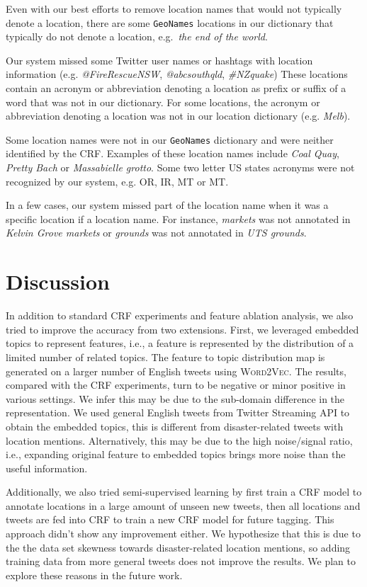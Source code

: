 \documentclass[11pt]{article}
\newcommand{\ie}{i.e.,\xspace}
\newcommand{\geoname}{\texttt{GeoNames}\xspace}
\newcommand{\myex}[1]{\textit{#1}}
\newcommand{\wordvec}{\textsc{Word2Vec}\xspace}
\begin{document}
Even with our best efforts to remove location names that would not typically denote a location, there are some \geoname locations in our dictionary that typically do not denote a location, e.g.~\myex{the end of the world}.

Our system missed some Twitter user names or hashtags with location information (e.g. \myex{@FireRescueNSW}, \myex{@abcsouthqld}, \myex{\#NZquake})
These locations contain an acronym or abbreviation denoting a location as prefix or suffix of a word that was not in our dictionary.
For some locations, the acronym or abbreviation denoting a location was not in our location dictionary (e.g. \myex{Melb}).

Some location names were not in our \geoname dictionary and were neither identified by the CRF.
Examples of these location names include \myex{Coal Quay}, \myex{Pretty Bach} or \myex{Massabielle grotto}.
Some two letter US states acronyms were not recognized by our system, e.g. OR, IR, MT or MT.

In a few cases, our system missed part of the location name when it was a specific location if a location name.
For instance, \myex{markets} was not annotated in \myex{Kelvin Grove markets} or \myex{grounds} was not annotated in \myex{UTS grounds}.

\section{Discussion}
\label{sec:discussion}

In addition to standard CRF experiments and feature ablation analysis, we also tried to improve the accuracy from two extensions.
First, we leveraged embedded topics to represent features, \ie a feature is represented by the distribution of a limited number of related topics.
The feature to topic distribution map is generated on a larger number of English tweets using \wordvec.
The results, compared with the CRF experiments, turn to be negative or minor positive in various settings.
We infer this may be due to the sub-domain difference in the representation.
We used general English tweets from Twitter Streaming API to obtain the embedded topics, this is different from disaster-related tweets with location mentions.
Alternatively, this may be due to the high noise/signal ratio, \ie expanding original feature to embedded topics brings more noise than the useful information.

Additionally, we also tried semi-supervised learning by first train a CRF model to annotate locations in a large amount of unseen new tweets, then all locations and tweets are fed into CRF to train a new CRF model for future tagging.
This approach didn't show any improvement either.
We hypothesize that this is due to the the data set skewness towards disaster-related location mentions, so adding training data from more general tweets does not improve the results.
We plan to explore these reasons in the future work.
\end{document}
